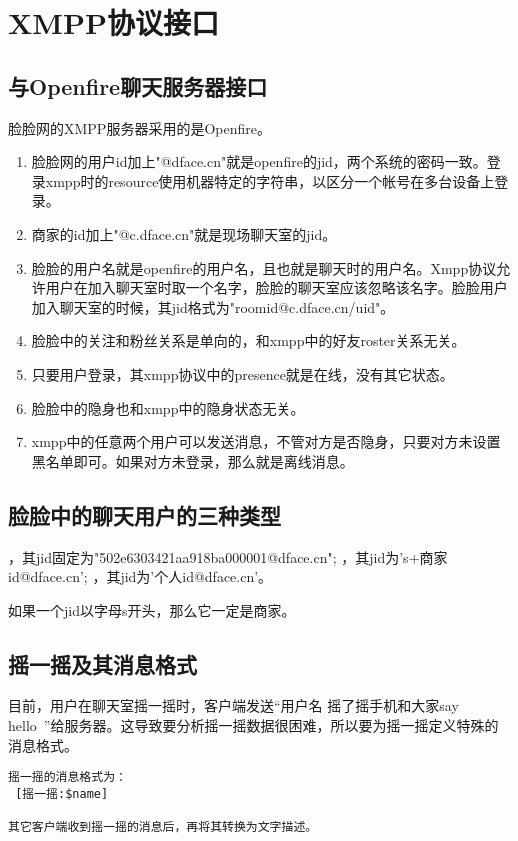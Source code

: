 \section{XMPP协议接口}


\subsection{与Openfire聊天服务器接口}
脸脸网的XMPP服务器采用的是Openfire。

\begin{enumerate}
\item 脸脸网的用户id加上"@dface.cn"就是openfire的jid，两个系统的密码一致。登录xmpp时的resource使用机器特定的字符串，以区分一个帐号在多台设备上登录。
\item 商家的id加上"@c.dface.cn"就是现场聊天室的jid。
\item 脸脸的用户名就是openfire的用户名，且也就是聊天时的用户名。Xmpp协议允许用户在加入聊天室时取一个名字，脸脸的聊天室应该忽略该名字。脸脸用户加入聊天室的时候，其jid格式为"roomid@c.dface.cn/uid"。
\item 脸脸中的关注和粉丝关系是单向的，和xmpp中的好友roster关系无关。
\item 只要用户登录，其xmpp协议中的presence就是在线，没有其它状态。
\item 脸脸中的隐身也和xmpp中的隐身状态无关。
\item xmpp中的任意两个用户可以发送消息，不管对方是否隐身，只要对方未设置黑名单即可。如果对方未登录，那么就是离线消息。
\end{enumerate}


\subsection{脸脸中的聊天用户的三种类型}

\begin{enumerate}
，其jid固定为"502e6303421aa918ba000001@dface.cn";
，其jid为's+商家id@dface.cn';
，其jid为'个人id@dface.cn'。
\end{enumerate}
如果一个jid以字母s开头，那么它一定是商家。


\subsection{摇一摇及其消息格式}
目前，用户在聊天室摇一摇时，客户端发送“用户名 摇了摇手机和大家say hello~”给服务器。这导致要分析摇一摇数据很困难，所以要为摇一摇定义特殊的消息格式。

\begin{verbatim}
摇一摇的消息格式为：
 [摇一摇:$name]

其它客户端收到摇一摇的消息后，再将其转换为文字描述。
\end{verbatim}



